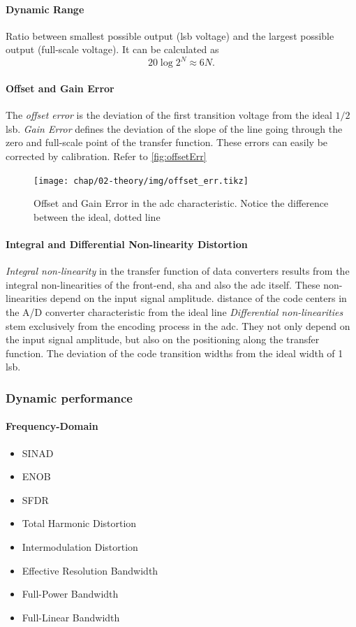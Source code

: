 \paragraph{Dynamic Range}
Ratio between smallest possible output (\gls{lsb} voltage) and the largest possible output (full-scale voltage). It can be calculated as
\begin{equation}
	20 \log 2^{N} \approx 6N.
\end{equation}


\paragraph{Offset and Gain Error}
The \textit{offset error} is the deviation of the first transition voltage from the ideal $1/2$ \gls{lsb}. \textit{Gain Error} defines the deviation of the slope of the line going through the zero and full-scale point of the transfer function. These errors can easily be corrected by calibration. Refer to \autoref{fig:offsetErr}

\begin{figure}[H]
	\centering
	\texttt{[image: chap/02-theory/img/offset\_err.tikz]}
	\caption{Offset and Gain Error in the \gls{adc} characteristic. Notice the difference between the ideal, dotted line}
	\label{fig:offsetErr}
\end{figure}


\paragraph{Integral and Differential Non-linearity Distortion} 
\textit{Integral non-linearity} in the transfer function of data converters results from the integral non-linearities of the front-end, \gls{sha} and also the \gls{adc} itself.
These non-linearities depend on the input signal amplitude.
distance of the code centers in the A/D converter characteristic from the ideal line
\textit{Differential non-linearities} stem exclusively from the encoding process in the \gls{adc}.
They not only depend on the input signal amplitude, but also on the positioning along the transfer function.
The deviation of the code transition widths from the ideal width
of 1 \gls{lsb}.




\subsubsection{Dynamic performance}
\paragraph{Frequency-Domain}
\begin{itemize}
	\item SINAD
	\item ENOB
	\item SFDR
	\item Total Harmonic Distortion
	\item Intermodulation Distortion
	\item Effective Resolution Bandwidth
	\item Full-Power Bandwidth
	\item Full-Linear Bandwidth
\end{itemize}
